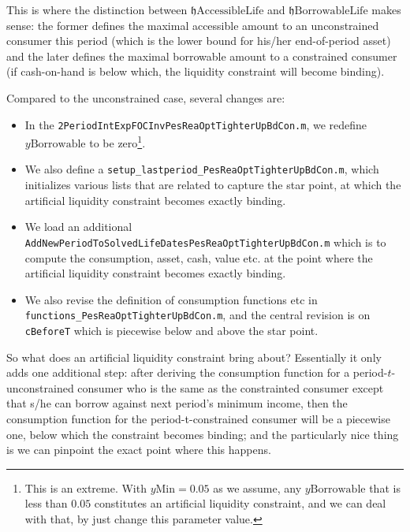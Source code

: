 \documentclass[titlepage,abstract]{\econtex}
\providecommand{\hEndBorrowableLife}{\mathfrak{h}\text{BorrowableLife}}
\providecommand{\hEndAccessibleLife}{\mathfrak{h}\text{AccessibleLife}}
\providecommand{\yMin}{y\text{Min}}
\providecommand{\yBorrowable}{y\text{Borrowable}}
\begin{document}
This is where the distinction between $\hEndAccessibleLife$ and $\hEndBorrowableLife$ makes sense: the former defines the maximal accessible amount to an unconstrained consumer this period (which is the lower bound for his/her end-of-period asset) and the later defines the maximal borrowable amount to a constrained consumer (if cash-on-hand is below which, the liquidity constraint will become binding).

Compared to the unconstrained case, several changes are:
\begin{itemize}
\item In the \texttt{2PeriodIntExpFOCInvPesReaOptTighterUpBdCon.m}, we redefine $\yBorrowable$ to be zero\footnote{This is an extreme. With $\yMin=0.05$ as we assume, any $\yBorrowable$ that is less than $0.05$ constitutes an artificial liquidity constraint, and we can deal with that, by just change this parameter value.}.
\item We also define a \texttt{setup\_lastperiod\_PesReaOptTighterUpBdCon.m}, which initializes various lists that are related to capture the star point, at which the artificial liquidity constraint becomes exactly binding. 
\item We load an additional \texttt{AddNewPeriodToSolvedLifeDatesPesReaOptTighterUpBdCon.m} which is to compute the consumption, asset, cash, value etc. at the point where the artificial liquidity constraint becomes exactly binding.
\item We also revise the definition of consumption functions etc in \texttt{functions\_PesReaOptTighterUpBdCon.m}, and the central revision is on \texttt{cBeforeT} which is piecewise below and above the star point.
\end{itemize}

So what does an artificial liquidity constraint bring about? Essentially it only adds one additional step: after deriving the consumption function for a period-$t$-unconstrained consumer who is the same as the constrainted consumer except that s/he can borrow against next period's minimum income, then the consumption function for the period-t-constrained consumer will be a piecewise one, below which the constraint becomes binding; and the particularly nice thing is we can pinpoint the exact point where this happens.
\end{document}
